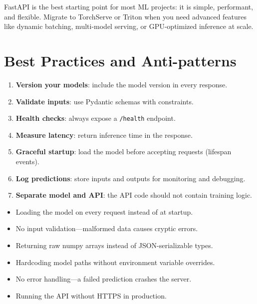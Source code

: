 \begin{remark}
FastAPI is the best starting point for most ML projects: it is simple,
performant, and flexible. Migrate to TorchServe or Triton when you
need advanced features like dynamic batching, multi-model serving, or
GPU-optimized inference at scale.
\end{remark}

\section{Best Practices and Anti-patterns}

\begin{bestpractice}[title=\textbf{Deployment best practices}]
\begin{enumerate}
  \item \textbf{Version your models}: include the model version in
    every response.
  \item \textbf{Validate inputs}: use Pydantic schemas with
    constraints.
  \item \textbf{Health checks}: always expose a \texttt{/health}
    endpoint.
  \item \textbf{Measure latency}: return inference time in the
    response.
  \item \textbf{Graceful startup}: load the model before accepting
    requests (lifespan events).
  \item \textbf{Log predictions}: store inputs and outputs for
    monitoring and debugging.
  \item \textbf{Separate model and API}: the API code should not
    contain training logic.
\end{enumerate}
\end{bestpractice}

\begin{antipattern}[title=\textbf{Deployment anti-patterns}]
\begin{itemize}
  \item Loading the model on every request instead of at startup.
  \item No input validation---malformed data causes cryptic errors.
  \item Returning raw numpy arrays instead of JSON-serializable types.
  \item Hardcoding model paths without environment variable overrides.
  \item No error handling---a failed prediction crashes the server.
  \item Running the API without HTTPS in production.
\end{itemize}
\end{antipattern}

